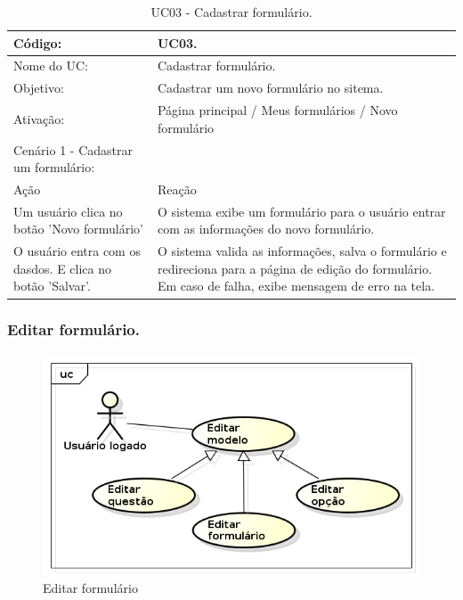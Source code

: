 \documentclass[11pt]{article}
\begin{document}
        \begin{table}[h]
          \begin{center}
            \begin{tabular}{ | p{7cm} | p{8cm} | }
              \hline
              Código: \cellcolor{gray} & UC03. \\
              \hline
              Nome do UC: \cellcolor{gray} & Cadastrar formulário. \\
              \hline
              Objetivo: \cellcolor{gray} & Cadastrar um novo formulário no sitema. \\
              \hline
              Ativação: \cellcolor{gray} & Página principal / Meus formulários / Novo formulário \\
              \hline
              \hline
              Cenário 1 - Cadastrar um formulário: &  \\
              \hline
              Ação\cellcolor{gray} & Reação\cellcolor{gray} \\
              \hline
              Um usuário clica no botão 'Novo formulário' & O sistema exibe um formulário para o usuário entrar com as informações do novo formulário. \\
              \hline
              O usuário entra com os dasdos. E clica no botão 'Salvar'. & O sistema valida as informações, salva o formulário e redireciona para a página de edição do formulário. Em caso de falha, exibe mensagem de erro na tela. \\
              \hline
            \end{tabular}
            \caption{UC03 - Cadastrar formulário.}
          \end{center}
        \end{table}

    \clearpage
      
      \subsubsection{Editar formulário.}

        \begin{figure}[h!]
          \centering
          \includegraphics[width=.5\textwidth]{editar.png}
          \caption{Editar formulário}
        \end{figure}
\end{document}
